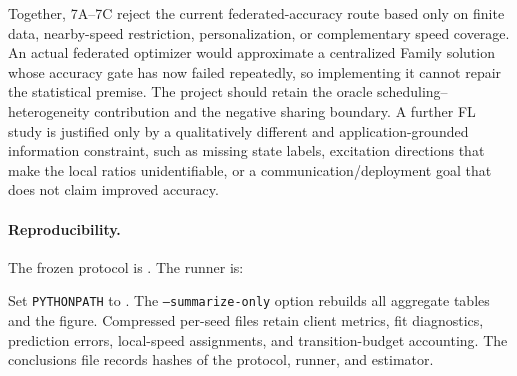 Together, 7A--7C reject the current federated-accuracy route based only on finite
data, nearby-speed restriction, personalization, or complementary speed coverage.
An actual federated optimizer would approximate a centralized Family solution
whose accuracy gate has now failed repeatedly, so implementing it cannot repair
the statistical premise. The project should retain the oracle scheduling--
heterogeneity contribution and the negative sharing boundary. A further FL
study is justified only by a qualitatively different and application-grounded
information constraint, such as missing state labels, excitation directions
that make the local ratios unidentifiable, or a communication/deployment goal
that does not claim improved accuracy.

\paragraph{Reproducibility.}
The frozen protocol is . The runner is:
\begin{quote}\small
{}
\end{quote}
Set \texttt{PYTHONPATH} to . The
\texttt{--summarize-only}
option rebuilds all aggregate tables and the figure. Compressed per-seed files
retain client metrics, fit diagnostics, prediction errors, local-speed assignments,
and transition-budget accounting. The conclusions file records hashes of the
protocol, runner, and estimator.
